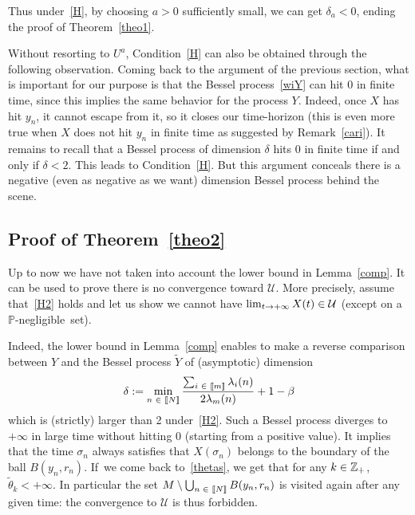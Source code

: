 \documentclass[AHL,Unicode,longabstracts,published]{cedram}
\newcommand{\f}[2]{\frac{#1}{#2}}
\newcommand{\cU}{\mathcal{U}}
\newcommand{\PP}{\mathbb{P}}
\newcommand{\ZZ}{\mathbb{Z}}
\newcommand{\iy}{\infty}
\newcommand{\wi}{\widetilde}
\let\oldin\in
\renewcommand{\in}{\mathchoice{\oldin}{\oldin}{\,\oldin\,}{\,\oldin\,}}
\renewcommand*{\to}{\mathchoice{\longrightarrow}{\rightarrow}{\rightarrow}{\rightarrow}}
\newcommand{\llbracket}{\mathopen{[\mkern -2.7mu[}}
\newcommand{\rrbracket}{\mathclose{]\mkern -2.7mu]}}
\newcommand{\lin}{\llbracket}
\newcommand{\rin}{\rrbracket}
\begin{document}
Thus under~\eqref{H}, by choosing $a>0$ sufficiently small, we can get $\delta_a<0$, ending the proof of Theorem~\ref{theo1}.



\begin{rema}
Without resorting to $U^a$, Condition~\eqref{H} can also be obtained through the following observation. Coming back to the argument of the previous section, what is important for our purpose is that the Bessel process~\eqref{wiY} can hit 0 in finite time, since this implies the same behavior for the process $Y$. Indeed, once $X$ has hit $y_n$, it cannot escape from it, so it closes our time-horizon (this is even more true when $X$ does not hit $y_n$ in finite time as suggested by Remark~\ref{cari}). It remains to recall that a Bessel process of dimension $\delta$ hits 0 in finite time if and only if $\delta<2$. This leads to Condition~\eqref{H}. But this argument conceals there is a negative (even as negative as we want) dimension Bessel process behind the scene.
\end{rema}

\subsection{Proof of Theorem~\ref{theo2}}

Up to now we have not taken into account the lower bound in Lemma~\ref{comp}. It can be used to prove there is no convergence toward $\cU$. More precisely, assume that~\eqref{H2} holds and let us show we cannot have $\lim_{t\to +\iy} X(t)\in \cU$ (except on a $\PP$-negligible~set).


Indeed, the lower bound in Lemma~\ref{comp} enables to make a reverse comparison between $Y$ and the Bessel process $\wi Y$ of (asymptotic) dimension
\begin{equation*}
\delta := 
\min_{n\in\lin N\rin}\f{\sum_{i\in\lin m\rin}\lambda_i(n)}{2\lambda_m(n)}+1-\beta
\end{equation*}
which is (strictly) larger than 2 under~\eqref{H2}. Such a Bessel process diverges to $+\iy$ in large time without hitting 0 (starting from a positive value). It implies that the time $\sigma_n$ always satisfies that $X(\sigma_n)$ belongs to the boundary of the ball $B(y_n,r_n)$. If~we come back to~\eqref{thetas}, we get that for any $k\in\ZZ_+$, $\wi\theta_k<+\iy$. In particular the set $M\setminus\bigcup_{n\in\lin N\rin} B(y_n,r_n)$ is visited again after any given time: the convergence to $\cU$ is thus forbidden.
\end{document}
